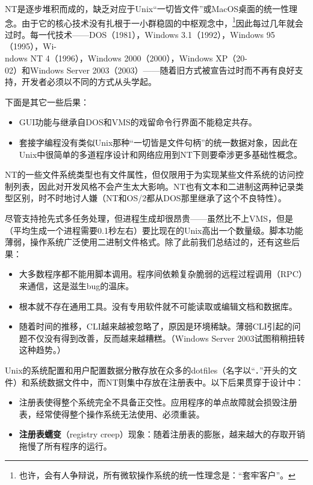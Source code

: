 \documentclass[11pt,oneside]{book}
\begin{document}
\begin{common-format}
NT是逐步堆积而成的，缺乏对应于Unix“一切皆文件”或MacOS桌面的统一性理念。由于它的核心技术没有扎根于一小群稳固的中枢观念中，\footnote{也许，会有人争辩说，所有微软操作系统的统一性理念是：“套牢客户”。}因此每过几年就会过时。每一代技术——DOS（1981），Windows 3.1（1992），Windows 95（1995），Wi-\\ndows NT 4（1996），Windows 2000（2000），Windows XP（20-\\02）和Windows Server 2003（2003）——随着旧方式被宣告过时而不再有良好支持，开发者必须以不同的方式从头学起。

下面是其它一些后果：
\begin{itemize}
\item GUI功能与继承自DOS和VMS的戏留命令行界面不能稳定共存。
\item 套接字编程没有类似Unix那种“一切皆是文件句柄”的统一数据对象，因此在Unix中很简单的多道程序设计和网络应用到NT下则要牵涉更多基础性概念。
\end{itemize}

NT的一些文件系统类型也有文件属性，但仅限用于为实现某些文件系统的访问控制列表，因此对开发风格不会产生太大影响。NT也有文本和二进制这两种记录类型区别，时不时地讨人嫌（NT和OS/2都从DOS那里继承了这个不良特性）。

尽管支持抢先式多任务处理，但进程生成却很昂贵——虽然比不上VMS，但是（平均生成一个进程需要0.1秒左右）要比现在的Unix高出一个数量级。脚本功能薄弱，操作系统广泛使用二进制文件格式。除了此前我们总结过的，还有这些后果：

\begin{itemize}
\item 大多数程序都不能用脚本调用。程序间依赖复杂脆弱的远程过程调用（RPC）来通信，这是滋生bug的温床。
\item 根本就不存在通用工具。没有专用软件就不可能读取或编辑文档和数据库。
\item 随着时间的推移，CLI越来越被忽略了，原因是环境稀缺。薄弱CLI引起的问题不仅没有得到改善，反而越来越糟糕。（Windows Server 2003试图稍稍扭转这种趋势。）
\end{itemize}

Unix的系统配置和用户配置数据分散存放在众多的dotfiles（名字以“．”开头的文件）和系统数据文件中，而NT则集中存放在注册表中。以下后果贯穿于设计中：

\begin{itemize}
\item 注册表使得整个系统完全不具备正交性。应用程序的单点故障就会损毁注册表，经常使得整个操作系统无法使用、必须重装。
\item \textbf{注册表蠕变}（registry creep）现象：随着注册表的膨胀，越来越大的存取开销拖慢了所有程序的运行。
\end{itemize}


\end{common-format}
\end{document}
